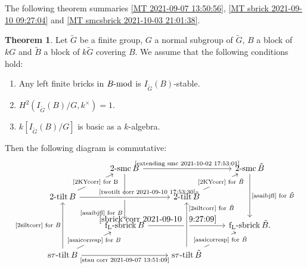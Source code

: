 \documentclass[pdftex,a4paper]{article}
\numberwithin{equation}{subsection}
\theoremstyle{definition}
\newtheorem{theorem}{Theorem}[section]
\newcommand{\lmod}{\operatorname{\mathrm{\hspace{-2pt}-mod}}}
\newcommand{\twotilt}{\operatorname{\mathrm{2-tilt}}}
\newcommand{\stautilt}{\operatorname{\mathrm{s\tau-tilt}}}
\newcommand{\flsbrick}{\operatorname{\mathrm{f_L-sbrick}}}
\newcommand{\twosmc}{\operatorname{\mathrm{2-smc}}}
\newcommand{\inertiagp}{I}
\begin{document}
The following theorem summaries \cref{MT 2021-09-07 13:50:56}, \cref{MT sbrick 2021-09-10 09:27:04} and \cref{MT smcsbrick 2021-10-03 21:01:38}.
\begin{theorem}\label{big com. diag. 2021-10-06 10:05:34}
	Let \(\tilde{G}\) be a finite group, \(G\) a normal subgroup of \(\tilde{G}\), \(B\) a block of \(kG\) and \(\tilde{B}\) a block of \(k\tilde{G}\) covering \(B\).
	We assume that the following conditions hold:
	\begin{enumerate}
		\item Any left finite bricks in \(B\lmod\) is \(\inertiagp_{\tilde G}(B)\)-stable.
		\item \(H^2(\inertiagp_{\tilde{G}}(B)/G,k^\times)=1\).
		\item \(k[\inertiagp_{\tilde{G}}(B)/G]\) is basic as a \(k\)-algebra.
	\end{enumerate}
	Then the following diagram is commutative:
	\begin{equation}
		\begin{tikzcd}
			&\twosmc B\ar[dd,"\text{\eqref{asaibjfl} for \(B\)}"'very near end]  \ar[rr,"\text{\eqref{extending smc 2021-10-02 17:53:01}}"]&&\twosmc \tilde{B}\\
			\twotilt B\ar[ru,"\text{\eqref{2KYcorr} for B}"description] \ar[rr,"\text{\eqref{twotilt corr 2021-09-10 17:53:30}}"near end,crossing over]&&\twotilt \tilde{B}\ar[ru,"\text{\eqref{2KYcorr} for \(\tilde{B}\)}"description] \\
			&\flsbrick B\ar[rr,"\eqref{sbrick corr 2021-09-10 09:27:09}"very near start]&&\flsbrick \tilde{B}\ar[uu,leftarrow,"\text{\eqref{asaibjfl} for \(\tilde{B}\)}"'].\\
			\stautilt B\ar[ru,"\text{\eqref{asaicorresp} for \(B\)}"description] \ar[uu,"\text{\eqref{2siltcorr} for \(B\)}"] \ar[rr,"\text{\eqref{stau corr 2021-09-07 13:51:09}}"'] &&\stautilt \tilde{B} \ar[ru,"\text{\eqref{asaicorresp} for \(\tilde{B}\)}"description] \ar[uu,"\text{\eqref{2siltcorr} for \(\tilde{B}\)}"'very near end,crossing over]
		\end{tikzcd}
	\end{equation}
\end{theorem}
\end{document}

